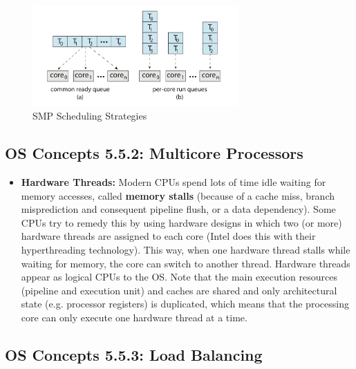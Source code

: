 \documentclass[12pt]{article}
\begin{document}
\begin{itemize}
\begin{figure}[ht]
            \centering
            \includegraphics[width=0.7\textwidth]{figures/smp-scheduling.jpg}
            \caption{SMP Scheduling Strategies}
            \label{fig:smp-scheduling}
        \end{figure}
\end{itemize}

\subsection*{OS Concepts 5.5.2: Multicore Processors}

\begin{itemize}
    \item \textbf{Hardware Threads:} Modern CPUs spend lots of time idle waiting for memory accesses, called \textbf{memory stalls} (because of a cache miss, branch misprediction and consequent pipeline flush, or a data dependency). Some CPUs try to remedy this by using hardware designs in which two (or more) hardware threads are assigned to each core (Intel does this with their hyperthreading technology). This way, when one hardware thread stalls while waiting for memory, the core can switch to another thread. Hardware threads appear as logical CPUs to the OS. Note that the main execution resources (pipeline and execution unit) and caches are shared and only architectural state (e.g. processor registers) is duplicated, which means that the processing core can only execute one hardware thread at a time.
\end{itemize}

\subsection*{OS Concepts 5.5.3: Load Balancing}
\end{document}
